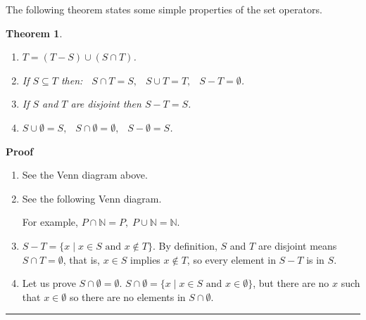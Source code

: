 \documentclass[12pt,a4paper]{article}
\newtheorem{theorem}{Theorem}
\newcommand*{\qed}{\hfill\rule[-2pt]{4pt}{10pt}}
\newcommand*{\comma}{,\:}
\newenvironment{proof}{\textbf{Proof}}{\qed}
\begin{document}
The following theorem states some simple properties of the set
operators.

\begin{theorem}\label{thm.seteq}\mbox{}
\begin{enumerate}
\item $T = (T-S) \cup (S\cap T)$.

\item If $S\subseteq T$ then:
$\;\;S \cap T = S\comma \;\; S \cup T = T\comma\;\; S - T = \emptyset$.

\item If $S$ and $T$ are disjoint then $S-T=S$.

\item $S \cup \emptyset = S\comma\;\; S \cap \emptyset = \emptyset\comma\;\;
S - \emptyset = S$.
\end{enumerate}
\end{theorem}

\begin{proof}
\begin{enumerate}
\item See the Venn diagram above.

\item See the following Venn diagram.

\begin{center}
\end{center}

For example, $P \cap \mathbb{N} = P,\; P \cup \mathbb{N} = \mathbb{N}$.

\item $S-T=\{x\mid x\in S \textrm{\ and \ } x\not\in T\}$. By definition, $S$ and $T$ are disjoint means $S\cap T=\emptyset$, that is, $x\in S$ implies $x\not \in T$, so every element in $S-T$ is in $S$.  

\item Let us prove $S\cap \emptyset = \emptyset$. $S\cap \emptyset=\{x\mid x\in S \textrm{\ and \ } x\in \emptyset\}$, but there are no $x$ such that $x\in \emptyset$ so there are no elements in $S\cap \emptyset$.
\end{enumerate}\vspace{-4ex}
\end{proof}
\end{document}
